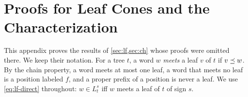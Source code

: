 
\section{Proofs for Leaf Cones and the Characterization}\label{app:lf}\label{app:leaf}

This appendix proves the results of \cref{sec:lf,sec:ch} whose proofs were
omitted there. We keep their notation. For a tree $t$, a word $w$
\emph{meets} a leaf $v$ of $t$ if $v\preceq w$. By the chain property, a word
meets at most one leaf, a word that meets no leaf is a position labeled $f$,
and a proper prefix of a position is never a leaf. We use
\cref{eq:lf-direct} throughout: $w\in L^s_t$ iff $w$ meets a leaf of $t$ of
sign $s$.

